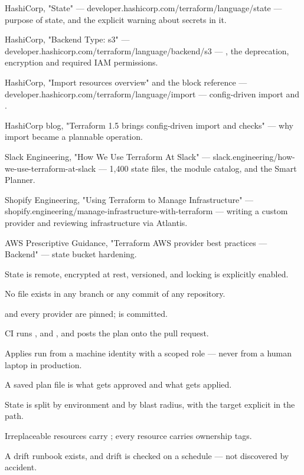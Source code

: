 \begin{wbitem}
  \item HashiCorp, "State" --- developer.hashicorp.com/terraform/language/state --- purpose of state, and the explicit warning about secrets in it.
  \item HashiCorp, "Backend Type: s3" --- developer.hashicorp.com/terraform/language/backend/s3 --- , the  deprecation, encryption and required IAM permissions.
  \item HashiCorp, "Import resources overview" and the  block reference --- developer.hashicorp.com/terraform/language/import --- config-driven import and .
  \item HashiCorp blog, "Terraform 1.5 brings config-driven import and checks" --- why import became a plannable operation.
  \item Slack Engineering, "How We Use Terraform At Slack" --- slack.engineering/how-we-use-terraform-at-slack --- 1{,}400 state files, the module catalog, and the Smart Planner.
  \item Shopify Engineering, "Using Terraform to Manage Infrastructure" --- shopify.engineering/manage-infrastructure-with-terraform --- writing a custom provider and reviewing infrastructure via Atlantis.
  \item AWS Prescriptive Guidance, "Terraform AWS provider best practices --- Backend" --- state bucket hardening.
\end{wbitem}

\begin{checklist}
  \item State is remote, encrypted at rest, versioned, and locking is explicitly enabled.
  \item No  file exists in any branch or any commit of any repository.
  \item {} and every provider are pinned;  is committed.
  \item CI runs ,  and , and posts the plan onto the pull request.
  \item Applies run from a machine identity with a scoped role --- never from a human laptop in production.
  \item A saved plan file is what gets approved and what gets applied.
  \item State is split by environment and by blast radius, with the target explicit in the path.
  \item Irreplaceable resources carry ; every resource carries ownership tags.
  \item A drift runbook exists, and drift is checked on a schedule --- not discovered by accident.
\end{checklist}

